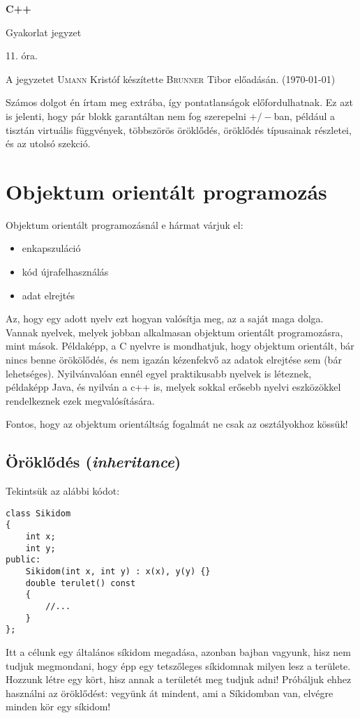 \documentclass[a4paper,11.5pt,table]{article}
\begin{document}
	\setlength\parindent{0pt}
	\def\<{<\hspace{0mm}<}
	
	\theoremstyle{definition}
	\newtheorem{note}{Megjegyzés}[subsection]
	
	\begin{center}
		{\LARGE\textbf{C++}}
		
		{\Large Gyakorlat jegyzet}
		
		11. óra.
	\end{center}
	A jegyzetet \textsc{Umann} Kristóf készítette \textsc{Brunner} Tibor  előadásán. (\today)
	\medskip
	
	Számos dolgot én írtam meg extrába, így pontatlanságok előfordulhatnak. Ez azt is jelenti, hogy pár blokk garantáltan nem fog szerepelni $+/-$ban, például a tisztán virtuális függvények, többszörös öröklődés, öröklődés típusainak részletei, és az utolsó szekció.
	\section{Objektum orientált programozás}
	Objektum orientált programozásnál e hármat várjuk el:
	\begin{itemize}
		\item enkapszuláció
		\item kód újrafelhasználás
		\item adat elrejtés
	\end{itemize}
	Az, hogy egy adott nyelv ezt hogyan valósítja meg, az a saját maga dolga. Vannak nyelvek, melyek jobban alkalmasan objektum orientált programozásra, mint mások. Példaképp, a C nyelvre is mondhatjuk, hogy objektum orientált, bár nincs benne örökölődés, és nem igazán kézenfekvő az adatok elrejtése sem (bár lehetséges). Nyilvánvalóan ennél egyel praktikusabb nyelvek is léteznek, példaképp Java, és nyilván a c++ is, melyek sokkal erősebb nyelvi eszközökkel rendelkeznek ezek megvalósítására.
	
	Fontos, hogy az objektum orientáltság fogalmát ne csak az osztályokhoz kössük!
	
	\subsection{Öröklődés (\textit{inheritance})}
	Tekintsük az alábbi kódot:
	\begin{lstlisting}
class Sikidom
{
	int x;
	int y;
public:
	Sikidom(int x, int y) : x(x), y(y) {}
	double terulet() const
	{
		//...
	}
};
	\end{lstlisting}
	Itt a célunk egy általános síkidom megadása, azonban bajban vagyunk, hisz nem tudjuk megmondani, hogy épp egy tetszőleges síkidomnak milyen lesz a területe. Hozzunk létre egy kört, hisz annak a területét meg tudjuk adni! Próbáljuk ehhez használni az öröklődést: vegyünk át mindent, ami a Síkidomban van, elvégre minden kör egy síkidom!
	
\end{document}
